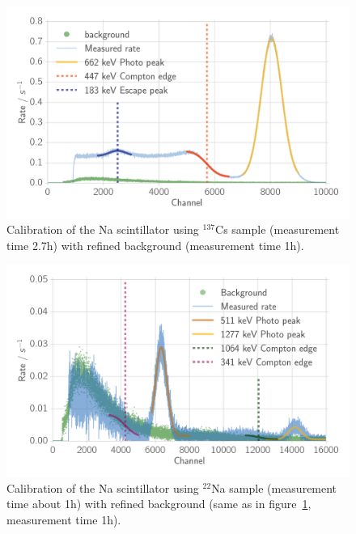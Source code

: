 \begin{figure}[htpb]
    \centering
    \includegraphics[width=0.9\linewidth]{./analysis/figures/histo_na_137cs}
    \caption{Calibration of the Na scintillator using $^{137}$Cs sample (measurement
    time 2.7h) with refined background (measurement time 1h). }
\label{fig:histo_na_137cs}
\end{figure}

\begin{figure}[htpb]
    \centering
    \includegraphics[width=0.9\linewidth]{./analysis/figures/histo_na_22na}
    \caption{Calibration of the Na scintillator using $^{22}$Na sample (measurement
        time about 1h) with refined background (same as in figure~\ref{fig:histo_na_137cs},
        measurement time 1h). }
\label{fig:histo_na_22na}
\end{figure}

